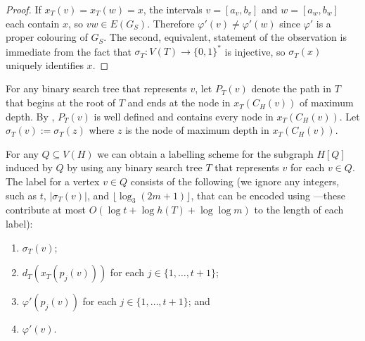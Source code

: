 \documentclass[kpfonts]{patmorin}
\begin{document}
\begin{proof}
  If $x_T(v)=x_T(w)=x$, the intervals $v=[a_v,b_v]$ and $w=[a_w,b_w]$ each contain $x$, so $vw\in E(G_S)$.  Therefore $\varphi'(v)\neq\varphi'(w)$ since $\varphi'$ is a proper colouring of $G_S$.  The second, equivalent, statement of the observation is immediate from the fact that $\sigma_T: V(T)\to\{0,1\}^*$ is injective, so $\sigma_T(x)$ uniquely identifies $x$.
\end{proof}

For any binary search tree that represents $v$, let $P_T(v)$ denote the path in $T$ that begins at the root of $T$ and ends at the node in $x_T(C_H(v))$ of maximum depth.  By , $P_T(v)$ is well defined and contains every node in $x_T(C_H(v))$.  Let $\sigma_T(v):=\sigma_T(z)$ where $z$ is the node of maximum depth in $x_T(C_H(v))$.

For any $Q\subseteq V(H)$ we can obtain a labelling scheme for the subgraph $H[Q]$ induced by $Q$ by using any binary search tree $T$ that represents $v$ for each $v\in Q$.  The label for a vertex $v\in Q$ consists of the following (we ignore any integers, such as $t$, $|\sigma_T(v)|$, and $\lfloor\log_3 (2m+1)\rfloor$, that can be encoded using ---these contribute at most $O(\log t + \log h(T) + \log\log m)$ to the length of each label):

\begin{enumerate}[label={(TC\arabic*)}, ref={TC\arabic*}, noitemsep]
  \item $\sigma_T(v)$;
  \item $d_T(x_T(p_j(v)))$ for each $j\in\{1,\ldots,t+1\}$;
  \item $\varphi'(p_j(v))$ for each $j\in\{1,\ldots,t+1\}$; and
  \item $\varphi'(v)$.
\end{enumerate}
\end{document}
